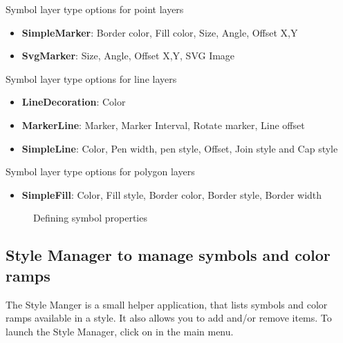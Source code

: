 \begin{description}
\item Symbol layer type options for point layers
\begin{itemize}[label=--]
\item \textbf{SimpleMarker}: Border color, Fill color, Size, Angle, Offset X,Y
\item \textbf{SvgMarker}: Size, Angle, Offset X,Y, SVG Image
\end{itemize}
\item Symbol layer type options for line layers
\begin{itemize}[label=--]
\item \textbf{LineDecoration}: Color
\item \textbf{MarkerLine}: Marker, Marker Interval, Rotate marker, Line offset
\item \textbf{SimpleLine}: Color, Pen width, pen style, Offset, Join style and Cap style
\end{itemize}
\item Symbol layer type options for polygon layers
\begin{itemize}[label=--]
\item \textbf{SimpleFill}: Color, Fill style, Border color, Border style, Border width
\end{itemize}
\end{description}


\begin{figure}[ht]
\centering
   \hspace{1cm}
   \hspace{1cm}
\caption{Defining symbol properties \nixcaption}
\end{figure}

\subsection{Style Manager to manage symbols and color ramps}\label{subsec:stylemanager}

The Style Manger is a small helper application, that lists symbols and color
ramps available in a style. It also allows you to add and/or remove items. To
launch the Style Manager, click on  \arrow {} in the main menu.

